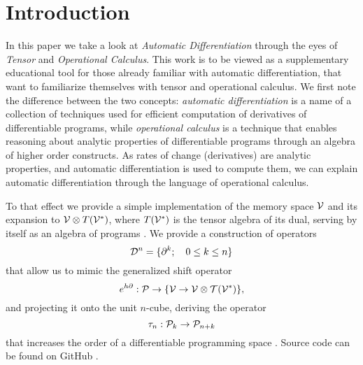 \section{Introduction}\label{sec:introduction}

In this paper we take a look at \emph{Automatic Differentiation} through the eyes of \emph{Tensor} and \emph{Operational Calculus}. This work is to be viewed as a supplementary educational tool for those already familiar with automatic differentiation, that want to familiarize themselves with tensor and operational calculus. We first note the difference between the two concepts: \emph{automatic differentiation} is a name of a collection of techniques used for efficient computation of derivatives of differentiable programs, while \emph{operational calculus} is a technique that enables reasoning about analytic properties of differentiable programs through an algebra of higher order constructs. As rates of change (derivatives) are analytic properties, and automatic differentiation is used to compute them, we can explain automatic differentiation through the language of operational calculus.

To that effect we provide a simple implementation of the memory space $\mathcal{V}$ and its expansion to $\mathcal{V}\otimes T(\mathcal{V}^*)$, where $T(\mathcal{V}^*)$ is the tensor algebra of its dual, serving by itself as an algebra of programs \cite[Definition~4.1]{OperationalCalculus}.
We provide a construction of operators
\begin{equation}
\mathcal{D}^n=\{\partial^k;\quad 0\le k\le n\}
\end{equation}
that allow us to mimic the generalized shift operator \cite[Theorem~5.2]{OperationalCalculus}
 \begin{equation}
   e^{h\partial}:\mathcal{P}\to \{\mathcal{V}\to \mathcal{V}\otimes \mathcal{T}(\mathcal{V}^*)\},
         \end{equation}
and projecting it onto the unit $n$-cube, deriving the operator 
\begin{equation}\label{eq:sumd}
\tau_n:\mathcal{P}_k\to\mathcal{P}_{n+k}
\end{equation} 
that increases the order of a differentiable programming space \cite[Proposition~5.1]{OperationalCalculus}.
Source code can be found on GitHub \cite{dCpp}.

